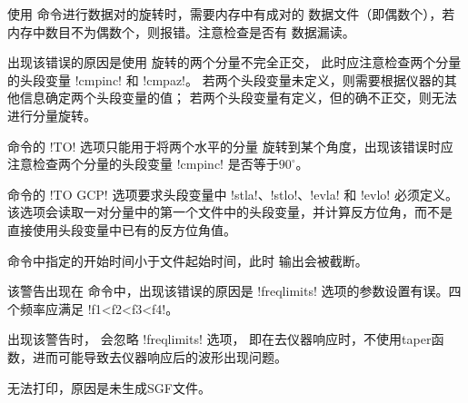 使用  命令进行数据对的旋转时，需要内存中有成对的
数据文件（即偶数个），若内存中数目不为偶数个，则报错。注意检查是否有
数据漏读。

出现该错误的原因是使用  旋转的两个分量不完全正交，
此时应注意检查两个分量的头段变量 !cmpinc! 和 !cmpaz!。
若两个头段变量未定义，则需要根据仪器的其他信息确定两个头段变量的值；
若两个头段变量有定义，但的确不正交，则无法进行分量旋转。

 命令的 !TO! 选项只能用于将两个水平的分量
旋转到某个角度，出现该错误时应注意检查两个分量的头段变量 !cmpinc!
是否等于$90^\circ$。

 命令的 !TO GCP! 选项要求头段变量中
!stla!、!stlo!、!evla! 和 !evlo! 必须定义。
该选项会读取一对分量中的第一个文件中的头段变量，并计算反方位角，而不是
直接使用头段变量中已有的反方位角值。

 命令中指定的开始时间小于文件起始时间，此时
输出会被截断。

该警告出现在  命令中，出现该错误的原因是 !freqlimits!
选项的参数设置有误。四个频率应满足 !f1<f2<f3<f4!。

出现该警告时， 会忽略 !freqlimits! 选项，
即在去仪器响应时，不使用taper函数，进而可能导致去仪器响应后的波形出现问题。

无法打印，原因是未生成SGF文件。
